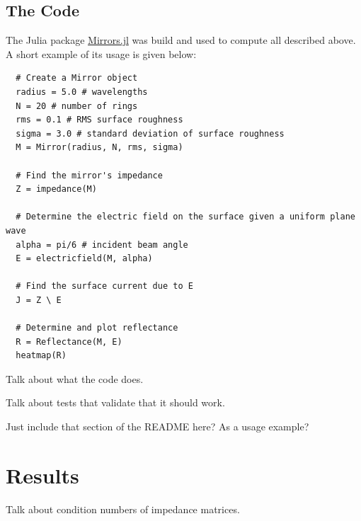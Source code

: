 \documentclass[etd,oneside,senior]{BYUPhys}
\begin{document}
\section{The Code}\label{chap:code} %

The Julia package \href{https://github.com/mjg0/Mirrors.jl}{Mirrors.jl} was build and used to compute all described above. A short example of its usage is given below:

\begin{verbatim}
  # Create a Mirror object
  radius = 5.0 # wavelengths
  N = 20 # number of rings
  rms = 0.1 # RMS surface roughness
  sigma = 3.0 # standard deviation of surface roughness
  M = Mirror(radius, N, rms, sigma)

  # Find the mirror's impedance
  Z = impedance(M)

  # Determine the electric field on the surface given a uniform plane wave
  alpha = pi/6 # incident beam angle
  E = electricfield(M, alpha)

  # Find the surface current due to E
  J = Z \ E

  # Determine and plot reflectance
  R = Reflectance(M, E)
  heatmap(R)
\end{verbatim}

Talk about what the code does.

Talk about tests that validate that it should work.

Just include that section of the README here? As a usage example?







\chapter{Results}\label{chap:results}

Talk about condition numbers of impedance matrices.

\end{document}
